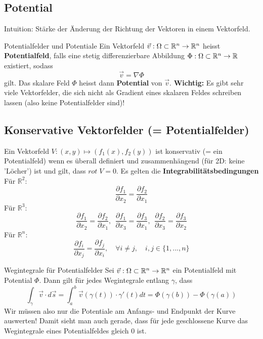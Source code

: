\subsection{Potential}

Intuition: Stärke der Änderung der Richtung der Vektoren in einem Vektorfeld.

\begin{Definition}{Potentialfelder und Potentiale}{}
	Ein Vektorfeld $\vec{v} : \Omega \subset \mathbb{R}^n \to \mathbb{R}^n$ heisst \textbf{Potentialfeld}, falls eine stetig differenzierbare Abbildung $\Phi : \Omega \subset \mathbb{R}^n \to \mathbb{R}$ existiert, sodass \[\vec{v} = \nabla \Phi\] gilt. Das skalare Feld $\Phi$ heisst dann \textbf{Potential} von $\vec{v}$. \textbf{Wichtig:} Es gibt sehr viele Vektorfelder, die sich nicht als Gradient eines skalaren Feldes schreiben lassen (also keine Potentialfelder sind)!
\end{Definition}

\subsection{Konservative Vektorfelder (= Potentialfelder)}
Ein Vektorfeld $V: (x, y) \mapsto (f_1(x), f_2(y))$ ist konservativ (= ein Potentialfeld) wenn es überall definiert
und zusammenhängend (für 2D: keine 'Löcher') ist und gilt, dass $rot \;V = 0$. Es gelten die \textbf{Integrabilitätsbedingungen} \\ 
Für $\mathbb{R}^2$:
\[ \frac{\partial f_1}{\partial x_2} = \frac{\partial f_2}{\partial x_1} \]
Für $\mathbb{R}^3$:
\[ \frac{\partial f_1}{\partial x_2} =  \frac{\partial f_2}{\partial x_1}, 
~~  \frac{\partial f_1}{\partial x_3} = \frac{\partial f_3}{\partial x_1},
~~ \frac{\partial f_2}{\partial x_3} =  \frac{\partial f_3}{\partial x_2}
\]
Für $\mathbb{R}^n$:
\[
	\frac{\partial f_i}{\partial x_j} =  \frac{\partial f_j}{\partial x_i},
	\quad
	\forall i \neq j,
	\quad
	i, j \in \{1,...,n\}
\]

\begin{Satz}{Wegintegrale für Potentialfelder}{}
	Sei $\vec{v} : \Omega \subset \mathbb{R}^n \to \mathbb{R}^n$ ein Potentialfeld mit Potential $\Phi$. Dann gilt für jedes Wegintegrale entlang $\gamma$, dass
	\[
		\int_\gamma \vec{v} \cdot d\vec{s} = 
		\int_a^b \vec{v}(\gamma(t)) \cdot \gamma'(t) dt =
		\Phi(\gamma(b)) - \Phi(\gamma(a))
	\]
	Wir müssen also nur die Potentiale am Anfangs- und Endpunkt der Kurve auswerten! Damit sieht man auch gerade, dass für jede geschlossene Kurve das Wegintegrale eines Potentialfeldes gleich 0 ist. 
\end{Satz}

